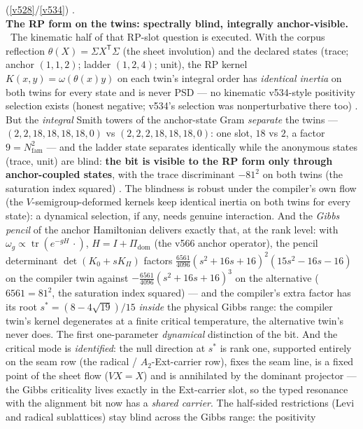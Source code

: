\documentclass[11pt,a4paper]{article}
\newcommand{\Nfam}{N_{\mathrm{fam}}}
\theoremstyle{definition}
\begin{document}
\begin{winbox}
(\vref{v528}/\vref{v534}) \mO.
\smallskip\\
\noindent\textbf{The RP form on the twins: spectrally blind, integrally anchor-visible.}
\ The kinematic half of that RP-slot question is executed.  With the
corpus reflection $\theta(X)=\Sigma X^{\mathsf T}\Sigma$ (the sheet involution) and the declared
states (trace; anchor $(1,1,2)$; ladder $(1,2,4)$; unit), the RP kernel
$K(x,y)=\omega(\theta(x)y)$ on each twin's integral order has \emph{identical inertia} on both
twins for every state and is never PSD --- no kinematic v534-style positivity selection exists
(honest negative; v534's selection was nonperturbative there too) \mE.  But the \emph{integral}
Smith towers of the anchor-state Gram \emph{separate} the twins --- $(2,2,18,18,18,18,0)$ vs
$(2,2,2,18,18,18,0)$: one slot, $18$ vs $2$, a factor $9=\Nfam^2$ --- and the ladder state
separates identically while the anonymous states (trace, unit) are blind: \textbf{the bit is
visible to the RP form only through anchor-coupled states}, with the trace discriminant
$-81^2$ on both twins (the saturation index squared) \mE.  The blindness is robust under the
compiler's own flow (the $V$-semigroup-deformed kernels keep identical inertia on both twins
for every state): a dynamical selection, if any, needs genuine interaction.  And the
\emph{Gibbs pencil} of the anchor Hamiltonian delivers exactly that, at the rank level: with
$\omega_g\propto\operatorname{tr}(e^{-gH}\,\cdot)$, $H=I+\Pi_{\mathrm{dom}}$ (the v566
anchor operator), the pencil determinant $\det(K_0+sK_\Pi)$ factors
$\tfrac{6561}{4096}(s^2{+}16s{+}16)^2(15s^2{-}16s{-}16)$ on the compiler twin against
$-\tfrac{6561}{4096}(s^2{+}16s{+}16)^3$ on the alternative ($6561=81^2$, the saturation index
squared) --- and the compiler's extra factor has its root $s^*=(8-4\sqrt{19})/15$ \emph{inside}
the physical Gibbs range: the compiler twin's kernel degenerates at a finite critical
temperature, the alternative twin's never does.  The first one-parameter \emph{dynamical}
distinction of the bit.  And the critical mode is \emph{identified}: the null direction at
$s^*$ is rank one, supported entirely on the seam row (the radical / $A_2$-Ext-carrier row),
fixes the seam line, is a fixed point of the sheet flow ($VX=X$) and is annihilated by the
dominant projector --- the Gibbs criticality lives exactly in the Ext-carrier slot, so the
typed resonance with the alignment bit now has a \emph{shared carrier}.  The half-sided
restrictions (Levi and radical sublattices) stay blind across the Gibbs range: the positivity

\end{winbox}
\end{document}
